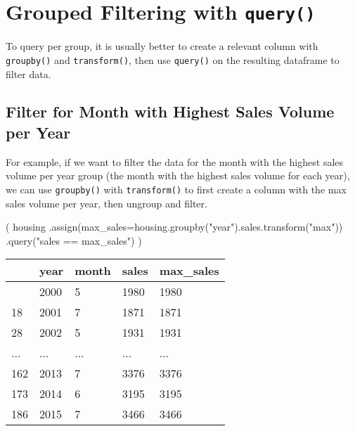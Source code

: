 \documentclass[
  letterpaper,
  DIV=11,
  numbers=noendperiod]{scrreprt}
\newenvironment{Shaded}{\begin{snugshade}}{\end{snugshade}}
\newcommand{\NormalTok}[1]{\textcolor[rgb]{0.00,0.23,0.31}{#1}}
\newcommand{\OperatorTok}[1]{\textcolor[rgb]{0.37,0.37,0.37}{#1}}
\newcommand{\StringTok}[1]{\textcolor[rgb]{0.13,0.47,0.30}{#1}}
\begin{document}
\section{\texorpdfstring{Grouped Filtering with
\texttt{query()}}{Grouped Filtering with query()}}\label{grouped-filtering-with-query}

To query per group, it is usually better to create a relevant column
with \texttt{groupby()} and \texttt{transform()}, then use
\texttt{query()} on the resulting dataframe to filter data.

\subsection{Filter for Month with Highest Sales Volume per
Year}\label{filter-for-month-with-highest-sales-volume-per-year}

For example, if we want to filter the data for the month with the
highest sales volume per year group (the month with the highest sales
volume for each year), we can use \texttt{groupby()} with
\texttt{transform()} to first create a column with the max sales volume
per year, then ungroup and filter.

\begin{Shaded}
\begin{Highlighting}[]
\NormalTok{(}
\NormalTok{housing}
\NormalTok{  .assign(max\_sales}\OperatorTok{=}\NormalTok{housing.groupby(}\StringTok{"year"}\NormalTok{).sales.transform(}\StringTok{"max"}\NormalTok{))}
\NormalTok{  .query(}\StringTok{"sales == max\_sales"}\NormalTok{)}
\NormalTok{)}
\end{Highlighting}
\end{Shaded}

\begin{longtable}[]{@{}lllll@{}}
\toprule\noalign{}
& year & month & sales & max\_sales \\
\midrule\noalign{}
\endhead
\bottomrule\noalign{}
\endlastfoot
4 & 2000 & 5 & 1980 & 1980 \\
18 & 2001 & 7 & 1871 & 1871 \\
28 & 2002 & 5 & 1931 & 1931 \\
... & ... & ... & ... & ... \\
162 & 2013 & 7 & 3376 & 3376 \\
173 & 2014 & 6 & 3195 & 3195 \\
186 & 2015 & 7 & 3466 & 3466 \\
\end{longtable}
\end{document}
